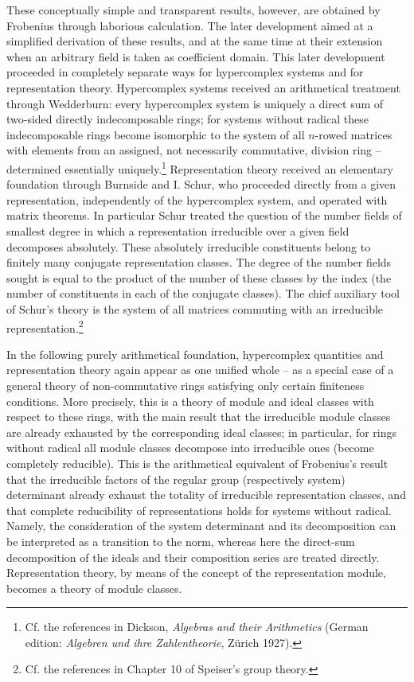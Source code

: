\documentclass[11pt]{article}
\begin{document}
These conceptually simple and transparent results, however, are obtained by Frobenius through laborious calculation. The later development aimed at a simplified derivation of these results, and at the same time at their extension when an arbitrary field is taken as coefficient domain. This later development proceeded in completely separate ways for hypercomplex systems and for representation theory. Hypercomplex systems received an arithmetical treatment through Wedderburn: every hypercomplex system is uniquely a direct sum of two-sided directly indecomposable rings; for systems without radical these indecomposable rings become isomorphic to the system of all $n$-rowed matrices with elements from an assigned, not necessarily commutative, division ring -- determined essentially uniquely.\footnote{Cf. the references in Dickson, \emph{Algebras and their Arithmetics} (German edition: \emph{Algebren und ihre Zahlentheorie}, Zürich 1927).} Representation theory received an elementary foundation through Burnside and I. Schur, who proceeded directly from a given representation, independently of the hypercomplex system, and operated with matrix theorems. In particular Schur treated the question of the number fields of smallest degree in which a representation irreducible over a given field decomposes absolutely. These absolutely irreducible constituents belong to finitely many conjugate representation classes. The degree of the number fields sought is equal to the product of the number of these classes by the index (the number of constituents in each of the conjugate classes). The chief auxiliary tool of Schur's theory is the system of all matrices commuting with an irreducible representation.\footnote{Cf. the references in Chapter 10 of Speiser's group theory.}

In the following purely arithmetical foundation, hypercomplex quantities and representation theory again appear as one unified whole -- as a special case of a general theory of non-commutative rings satisfying only certain finiteness conditions. More precisely, this is a theory of module and ideal classes with respect to these rings, with the main result that the irreducible module classes are already exhausted by the corresponding ideal classes; in particular, for rings without radical all module classes decompose into irreducible ones (become completely reducible). This is the arithmetical equivalent of Frobenius's result that the irreducible factors of the regular group (respectively system) determinant already exhaust the totality of irreducible representation classes, and that complete reducibility of representations holds for systems without radical. Namely, the consideration of the system determinant and its decomposition can be interpreted as a transition to the norm, whereas here the direct-sum decomposition of the ideals and their composition series are treated directly. Representation theory, by means of the concept of the representation module, becomes a theory of module classes.
\end{document}
